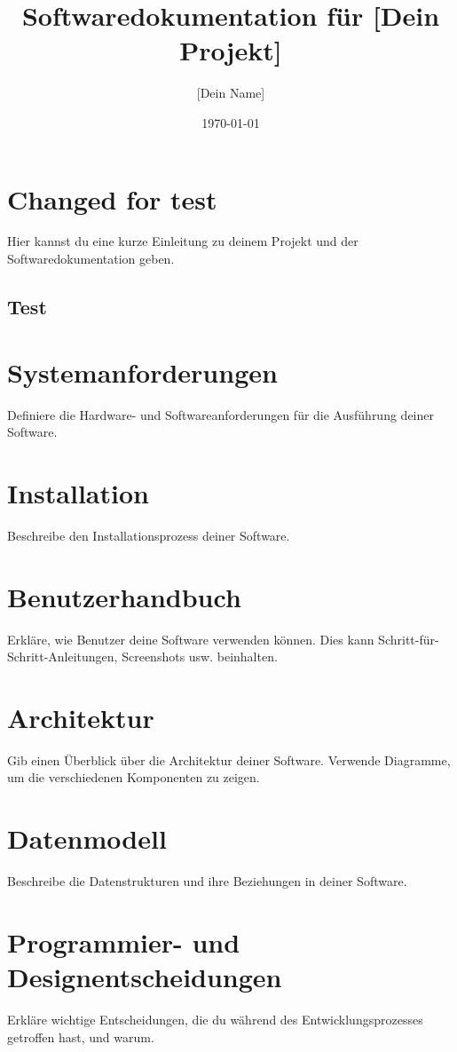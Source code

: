 \documentclass[a4paper, 12pt]{article}
\title{Softwaredokumentation für [Dein Projekt]}
\author{[Dein Name]}
\date{\today}
\begin{document}
    \maketitle
    \tableofcontents
    \newpage

    \section{Changed for test}
    Hier kannst du eine kurze Einleitung zu deinem Projekt und der Softwaredokumentation geben.
    
    \subsection{Test}

    \section{Systemanforderungen}
    Definiere die Hardware- und Softwareanforderungen für die Ausführung deiner Software.

    \section{Installation}
    Beschreibe den Installationsprozess deiner Software.

    \section{Benutzerhandbuch}
    Erkläre, wie Benutzer deine Software verwenden können. Dies kann Schritt-für-Schritt-Anleitungen, Screenshots usw. beinhalten.

    \section{Architektur}
    Gib einen Überblick über die Architektur deiner Software. Verwende Diagramme, um die verschiedenen Komponenten zu zeigen.

    \section{Datenmodell}
    Beschreibe die Datenstrukturen und ihre Beziehungen in deiner Software.

    \section{Programmier- und Designentscheidungen}
    Erkläre wichtige Entscheidungen, die du während des Entwicklungsprozesses getroffen hast, und warum.
\end{document}
